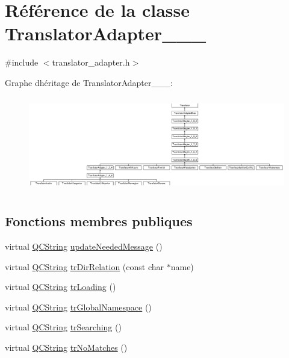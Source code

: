 \hypertarget{class_translator_adapter__1__6__0}{}\section{Référence de la classe Translator\+Adapter\+\_\+\_\+\_}
\label{class_translator_adapter__1__6__0}


{\ttfamily \#include $<$translator\+\_\+adapter.\+h$>$}

Graphe d\textquotesingle{}héritage de Translator\+Adapter\+\_\+\_\+\_\+:\begin{figure}[H]
\begin{center}
\leavevmode
\includegraphics[height=4.173441cm]{class_translator_adapter__1__6__0}
\end{center}
\end{figure}
\subsection*{Fonctions membres publiques}
\begin{DoxyCompactItemize}
\item 
virtual \hyperlink{class_q_c_string}{Q\+C\+String} \hyperlink{class_translator_adapter__1__6__0_abc231eb2c1864ca9f878e7e5deb94f54}{update\+Needed\+Message} ()
\item 
virtual \hyperlink{class_q_c_string}{Q\+C\+String} \hyperlink{class_translator_adapter__1__6__0_abe5f4a20e765b43baab350e095a2ffbc}{tr\+Dir\+Relation} (const char $\ast$name)
\item 
virtual \hyperlink{class_q_c_string}{Q\+C\+String} \hyperlink{class_translator_adapter__1__6__0_a86b196c04e1772acf373795d25ee86b1}{tr\+Loading} ()
\item 
virtual \hyperlink{class_q_c_string}{Q\+C\+String} \hyperlink{class_translator_adapter__1__6__0_afd249bfd8e208252314ed10403031695}{tr\+Global\+Namespace} ()
\item 
virtual \hyperlink{class_q_c_string}{Q\+C\+String} \hyperlink{class_translator_adapter__1__6__0_abfbe315313de7a800c2cfb3d860d458d}{tr\+Searching} ()
\item 
virtual \hyperlink{class_q_c_string}{Q\+C\+String} \hyperlink{class_translator_adapter__1__6__0_a984d8dc682c49badea360ea70756a928}{tr\+No\+Matches} ()
\end{DoxyCompactItemize}
